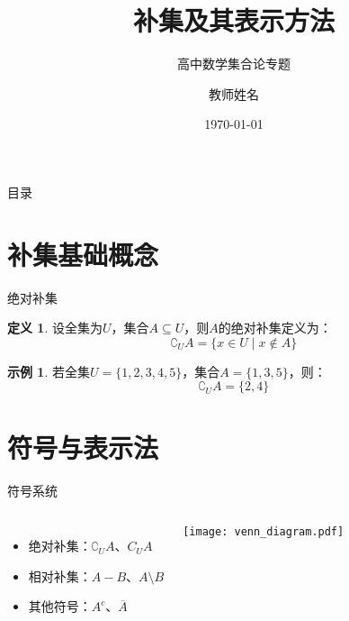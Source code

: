 \documentclass[10pt, aspectratio=169]{beamer}
\title{补集及其表示方法}
\subtitle{高中数学集合论专题}
\author{教师姓名}
\institute{XX学校}
\date{\today}
\theoremstyle{definition}
\newtheorem{definition}{定义}[section]
\theoremstyle{example}
\newtheorem{example}{示例}[section]
\theoremstyle{remark}
\begin{document}
\begin{frame}[plain] %
  \titlepage
\end{frame}

\begin{frame}{目录}
  \tableofcontents[hideallsubsections] %
\end{frame}

\section{补集基础概念}
\begin{frame}{绝对补集}
  \begin{definition}
    设全集为$ U $，集合$ A \subseteq U $，则$ A $的绝对补集定义为：
    $$
    \complement_U A = \{ x \in U \mid x \notin A \}
    $$
  \end{definition}
  
  \begin{example}
    若全集$ U = \{1,2,3,4,5\} $，集合$ A = \{1,3,5\} $，则：
    $$
    \complement_U A = \{2,4\}
    $$
  \end{example}
\end{frame}

\section{符号与表示法}
\begin{frame}{符号系统}
  \begin{columns}[t]
      \begin{itemize}
        \item 绝对补集：$ \complement_U A $、$ C_U A $
        \item 相对补集：$ A - B $、$ A \setminus B $
        \item 其他符号：$ A^c $、$ \overline{A} $
      \end{itemize}
      \begin{center}
        \texttt{[image: venn\_diagram.pdf]} %
      \end{center}
  \end{columns}
\end{frame}
\end{document}
